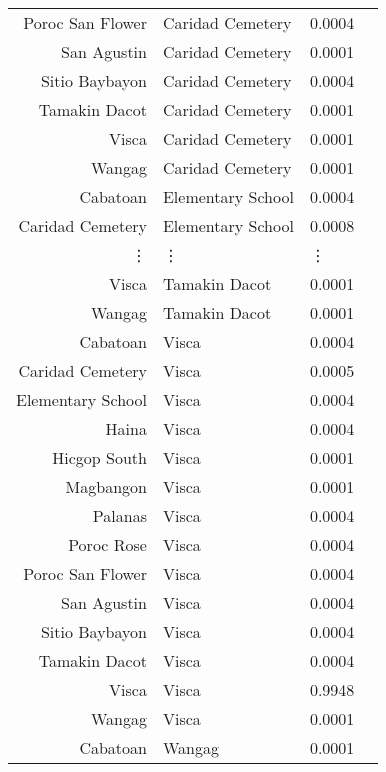 \documentclass[11pt]{article}
\begin{document}
\begin{tabular}{r|lll}
	 Poroc San Flower  & Caridad Cemetery  & 0.0004           \\
	 San Agustin       & Caridad Cemetery  & 0.0001           \\
	 Sitio Baybayon    & Caridad Cemetery  & 0.0004           \\
	 Tamakin Dacot     & Caridad Cemetery  & 0.0001           \\
	 Visca             & Caridad Cemetery  & 0.0001           \\
	 Wangag            & Caridad Cemetery  & 0.0001           \\
	 Cabatoan          & Elementary School & 0.0004           \\
	 Caridad Cemetery  & Elementary School & 0.0008           \\
	 ⋮ & ⋮ & ⋮\\
	 Visca             & Tamakin Dacot     & 0.0001           \\
	 Wangag            & Tamakin Dacot     & 0.0001           \\
	 Cabatoan          & Visca             & 0.0004           \\
	 Caridad Cemetery  & Visca             & 0.0005           \\
	 Elementary School & Visca             & 0.0004           \\
	 Haina             & Visca             & 0.0004           \\
	 Hicgop South      & Visca             & 0.0001           \\
	 Magbangon         & Visca             & 0.0001           \\
	 Palanas           & Visca             & 0.0004           \\
	 Poroc Rose        & Visca             & 0.0004           \\
	 Poroc San Flower  & Visca             & 0.0004           \\
	 San Agustin       & Visca             & 0.0004           \\
	 Sitio Baybayon    & Visca             & 0.0004           \\
	 Tamakin Dacot     & Visca             & 0.0004           \\
	 Visca             & Visca             & 0.9948           \\
	 Wangag            & Visca             & 0.0001           \\
	 Cabatoan          & Wangag            & 0.0001           \\

\end{tabular}
\end{document}
